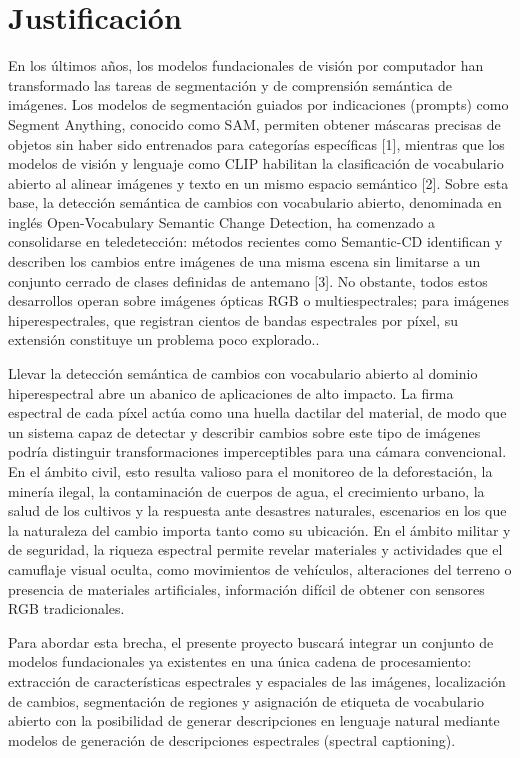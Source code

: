 \documentclass[12pt]{article}
\begin{document}
\section*{Justificación}

En los últimos años, los modelos fundacionales de visión por computador han transformado las tareas de segmentación y de comprensión semántica de imágenes. Los modelos de segmentación guiados por indicaciones (prompts) como Segment Anything, conocido como SAM, permiten obtener máscaras precisas de objetos sin haber sido entrenados para categorías específicas [1], mientras que los modelos de visión y lenguaje como CLIP habilitan la clasificación de vocabulario abierto al alinear imágenes y texto en un mismo espacio semántico [2]. Sobre esta base, la detección semántica de cambios con vocabulario abierto, denominada en inglés Open-Vocabulary Semantic Change Detection, ha comenzado a consolidarse en teledetección: métodos recientes como Semantic-CD identifican y describen los cambios entre imágenes de una misma escena sin limitarse a un conjunto cerrado de clases definidas de antemano [3]. No obstante, todos estos desarrollos operan sobre imágenes ópticas RGB o multiespectrales; para imágenes hiperespectrales, que registran cientos de bandas espectrales por píxel, su extensión constituye un problema poco explorado..

Llevar la detección semántica de cambios con vocabulario abierto al dominio hiperespectral abre un abanico de aplicaciones de alto impacto. La firma espectral de cada píxel actúa como una huella dactilar del material, de modo que un sistema capaz de detectar y describir cambios sobre este tipo de imágenes podría distinguir transformaciones imperceptibles para una cámara convencional. En el ámbito civil, esto resulta valioso para el monitoreo de la deforestación, la minería ilegal, la contaminación de cuerpos de agua, el crecimiento urbano, la salud de los cultivos y la respuesta ante desastres naturales, escenarios en los que la naturaleza del cambio importa tanto como su ubicación. En el ámbito militar y de seguridad, la riqueza espectral permite revelar materiales y actividades que el camuflaje visual oculta, como movimientos de vehículos, alteraciones del terreno o presencia de materiales artificiales, información difícil de obtener con sensores RGB tradicionales.

Para abordar esta brecha, el presente proyecto buscará integrar un conjunto de modelos fundacionales ya existentes en una única cadena de procesamiento: extracción de características espectrales y espaciales de las imágenes, localización de cambios, segmentación de regiones y asignación de etiqueta de vocabulario abierto con la posibilidad de generar descripciones en lenguaje natural mediante modelos de generación de descripciones espectrales (spectral captioning).
\end{document}
